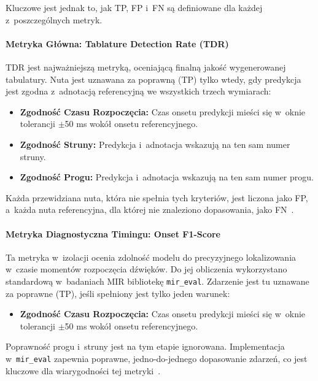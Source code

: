 Kluczowe jest jednak to, jak TP, FP i~FN są definiowane dla każdej z~poszczególnych metryk.

\paragraph{Metryka Główna: Tablature Detection Rate (TDR)}
TDR jest najważniejszą metryką, oceniającą finalną jakość wygenerowanej tabulatury. Nuta jest uznawana za poprawną (TP) tylko wtedy, gdy predykcja jest zgodna z~adnotacją referencyjną we wszystkich trzech wymiarach:
\begin{itemize}
    \item \textbf{Zgodność Czasu Rozpoczęcia:} Czas onsetu predykcji mieści się w~oknie tolerancji $\pm$50 ms wokół onsetu referencyjnego.
    \item \textbf{Zgodność Struny:} Predykcja i~adnotacja wskazują na ten sam numer struny.
    \item \textbf{Zgodność Progu:} Predykcja i~adnotacja wskazują na ten sam numer progu.
\end{itemize}
Każda przewidziana nuta, która nie spełnia tych kryteriów, jest liczona jako FP, a~każda nuta referencyjna, dla której nie znaleziono dopasowania, jako FN~\autocite{Wiggins2019TabCNN}.

\paragraph{Metryka Diagnostyczna Timingu: Onset F1-Score}
Ta metryka w~izolacji ocenia zdolność modelu do precyzyjnego lokalizowania w~czasie momentów rozpoczęcia dźwięków. Do jej obliczenia wykorzystano standardową w~badaniach MIR bibliotekę \texttt{mir\_eval}. Zdarzenie jest tu uznawane za poprawne (TP), jeśli spełniony jest tylko jeden warunek:
\begin{itemize}
    \item \textbf{Zgodność Czasu Rozpoczęcia:} Czas onsetu predykcji mieści się w~oknie tolerancji $\pm$50 ms wokół onsetu referencyjnego.
\end{itemize}
Poprawność progu i~struny jest na tym etapie ignorowana. Implementacja w~\texttt{mir\_eval} zapewnia poprawne, jedno-do-jednego dopasowanie zdarzeń, co jest kluczowe dla wiarygodności tej metryki~\autocite{Benetos2019AutomaticMusicTranscription}.

